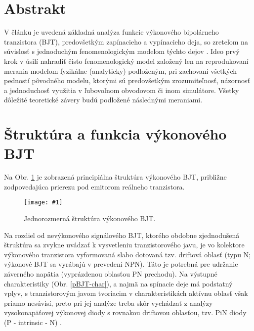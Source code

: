 \documentclass[a4paper, twoside, 12pt]{book}
\newcommand{\myfig}[3]
{
    \begin{figure}[!ht]
	\centering
	\texttt{[image: \#1]}
	\caption{#2}
	#3
    \end{figure}
}
\begin{document}

%




%

%

%


%
\appendix

%

%

%

\label{LastPage}






\section{Abstrakt}
V článku je uvedená základná analýza funkcie výkonového bipolárneho tranzistora (BJT), predovšetkým zapínacieho a vypínacieho deja, so zreteľom na súvislosť s jednoduchým fenomenologickým modelom týchto dejov \cite{lit:patocka-valsa}. Ideo prvý krok v úsilí nahradiť čisto fenomenologický model založený len na reprodukovaní merania modelom fyzikálne (analyticky) podloženým, pri zachovaní všetkých pedností pôvodného modelu, ktorými sú predovšetkým zrozumiteľnosť, názornosť a jednoduchosť využitia v ľubovoľnom obvodovom či inom simulátore. Všetky dôležité teoretické závery budú podložené následnými meraniami.

\section{Štruktúra a funkcia výkonového BJT}
Na Obr. \ref{fig:pBJT-1D} je zobrazená principiálna  štruktúra výkonového BJT, približne zodpovedajúca prierezu pod emitorom reálneho tranzistora.
\myfig{BJT_struktura_1D}{Jednorozmerná štruktúra výkonového BJT.}{\label{fig:pBJT-1D}}
Na rozdiel od nevýkonového signálového BJT, ktorého obdobne zjednodušená štruktúra sa zvykne uvádzať k vysvetleniu tranzistorového javu, je vo kolektore výkonového tranzistora vyformovaná slabo dotovaná tzv. driftová oblasť (typu N; výkonové BJT sa vyrábajú v prevedení NPN). Táto je potrebná pre udržanie záverného napätia (vyprázdenou oblasťou PN prechodu). Na výstupné charakteristiky (Obr. \ref{pBJT-char}), a najmä na spínacie deje má podstatný vplyv, s tranzistorovým javom tvoriacim v charakteristikách aktívnu oblasť však priamo nesúvisí, preto pri jej analýze treba skôr vychádzať z analýzy vysokonapäťovej výkonovej diody s rovnakou driftovou oblasťou, tzv. PiN diody (P - intrinsic - N) \cite{lit:baliga}. 
\end{document}
